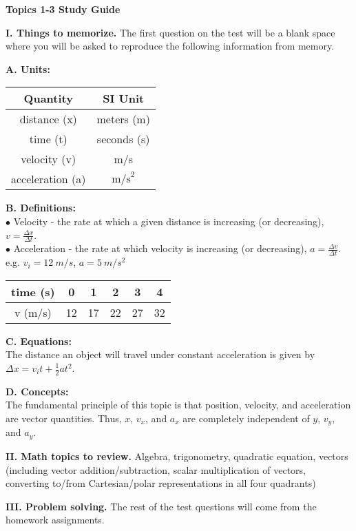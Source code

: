 \documentclass[11pt]{article}
\begin{document}
{\centering
\textbf{Topics 1-3 Study Guide} \par
\vspace{\baselineskip}
}


\textbf{I. Things to memorize.}
The first question on the test will be a blank space where you will be asked to reproduce the following information from memory.
\vspace{0.5\baselineskip}

\begin{addmargin}[1em]{0em}%
\textbf{A. Units:}

\vspace{0.25\baselineskip}
\begin{tabular}{ |c|c| } 
\hline
Quantity & SI Unit \\ 
\hline
distance (x) & meters (m) \\ 
\hline
time (t) & seconds (s) \\ 
\hline
velocity (v) & m/s \\ 
\hline
acceleration (a) & $\text{m/s}^2$ \\ 
\hline
\end{tabular}
\vspace{0.75\baselineskip}

\textbf{B. Definitions:} \\
$\bullet$ Velocity - the rate at which a given distance is increasing (or decreasing), $v = \frac{\Delta x}{\Delta t}$. \\
$\bullet$ Acceleration - the rate at which velocity is increasing (or decreasing), $a = \frac{\Delta v}{\Delta t}$. \\
e.g. $v_i = 12 \ m/s$, $a = 5 \ m/s^2$

\vspace{0.25\baselineskip}
\begin{tabular}{ |c|c|c|c|c|c| } 
\hline
time (s) & 0 & 1 & 2 & 3 & 4 \\ 
\hline
v (m/s) & 12 & 17 & 22 & 27 & 32 \\ 
\hline
\end{tabular}
\vspace{0.75\baselineskip}

\textbf{C. Equations:} \\
The distance an object will travel under constant acceleration is given by $\Delta x = v_i t + \frac{1}{2} a t^2$.
\vspace{0.75\baselineskip}

\textbf{D. Concepts:} \\
The fundamental principle of this topic is that position, velocity, and acceleration are vector quantities.
Thus, $x$, $v_x$, and $a_x$ are completely independent of $y$, $v_y$, and $a_y$.
\end{addmargin}


\vspace{\baselineskip}
\textbf{II. Math topics to review.}
Algebra, trigonometry, quadratic equation, vectors (including vector addition/subtraction, scalar multiplication of vectors, converting to/from Cartesian/polar representations in all four quadrants)


\vspace{\baselineskip}
\textbf{III. Problem solving.}
The rest of the test questions will come from the homework assignments.
\end{document}
